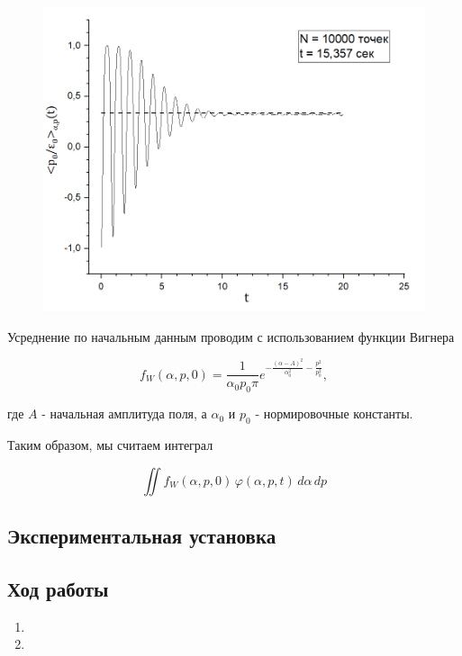 \documentclass[16pt, a4paper]{article}
\begin{document}
\begin{figure} 
    \includegraphics[width=1\linewidth]{3.PNG}
\end{figure}

Усреднение по начальным данным проводим с использованием функции Вигнера

$$ f_W(\alpha, p, 0) = \frac{1}{\alpha_0p_0\pi}e^{-\frac{(\alpha-A)^2}{\alpha_0^2}-\frac{p^2}{p_0^2}}, $$

где $A$ - начальная амплитуда поля, а $\alpha_0$ и $p_0$ - нормировочные константы.

Таким образом, мы считаем интеграл

$$ \iint f_W(\alpha, p, 0)\,\varphi(\alpha, p, t) \,d\alpha\,dp $$

\hspace{14pt}

\subsection*{Экспериментальная установка}

\subsection*{Ход работы}

\begin{enumerate}
    \item 

    \item
    
\end{enumerate}
\end{document}

